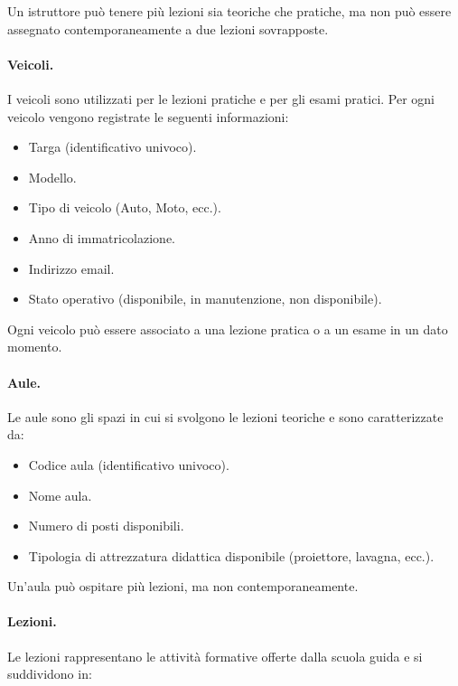 \documentclass[10pt,twoside]{article}
\begin{document}
{    Un istruttore può tenere più lezioni sia teoriche che pratiche, ma non può essere assegnato contemporaneamente a due lezioni sovrapposte.
    

    \paragraph{Veicoli.}
    I veicoli sono utilizzati per le lezioni pratiche e per gli esami pratici. Per ogni veicolo vengono registrate le seguenti informazioni:
    
    \begin{itemize}
        \item Targa (identificativo univoco).
        \item Modello.
        \item Tipo di veicolo (Auto, Moto, ecc.).
        \item Anno di immatricolazione.
        \item Indirizzo email.
        \item Stato operativo (disponibile, in manutenzione, non disponibile).
    \end{itemize}

    Ogni veicolo può essere associato a una lezione pratica o a un esame in un dato momento.
    

    \paragraph{Aule.}
    Le aule sono gli spazi in cui si svolgono le lezioni teoriche e sono caratterizzate da:

    \begin{itemize}
        \item Codice aula (identificativo univoco).
        \item Nome aula.
        \item Numero di posti disponibili.
        \item Tipologia di attrezzatura didattica disponibile (proiettore, lavagna, ecc.).
    \end{itemize}

    Un’aula può ospitare più lezioni, ma non contemporaneamente.
    

    \paragraph{Lezioni.}
    Le lezioni rappresentano le attività formative offerte dalla scuola guida e si suddividono in:

}
\end{document}

